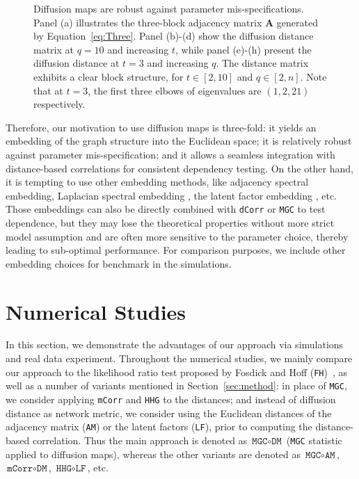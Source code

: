 \documentclass[12pt]{article}
\theoremstyle{definition}
\begin{document}
\begin{figure}[H]
\begin{subfigure}[b]{0.23\textwidth}
			\caption{}
			\label{fig:q10}
		\end{subfigure}
		\caption{Diffusion maps are robust against parameter mis-specifications. Panel (a) illustrates the three-block adjacency matrix $\mathbf{A}$ generated by Equation~\ref{eq:Three}. Panel (b)-(d) show the diffusion distance matrix at $q=10$ and increasing $t$, while panel (e)-(h) present the diffusion distance at $t=3$ and increasing $q$. The distance matrix exhibits a clear block structure, for $t \in [2,10]$ and $q \in [2,n]$. Note that at $t=3$, the first three elbows of eigenvalues are $(1,2,21)$ respectively.}
		\label{fig:diffusions}
	\end{figure}
	
	Therefore, our motivation to use diffusion maps is three-fold: it yields an embedding of the graph structure into the Euclidean space; it is relatively robust against parameter mis-specification; and it allows a seamless integration with distance-based correlations for consistent dependency testing. On the other hand, it is tempting to use other embedding methods, like adjacency spectral embedding, Laplacian spectral embedding \citep{rohe2011spectral}, the latent factor embedding \citep{fosdick2015testing}, etc. Those embeddings can also be directly combined with \texttt{dCorr} or \texttt{MGC} to test dependence, but they may lose the theoretical properties without more strict model assumption and are often more sensitive to the parameter choice, thereby leading to sub-optimal performance. For comparison purposes, we include other embedding choices for benchmark in the simulations.
	
	
	\section{Numerical Studies}
	\label{sec:simulation}
	
	In this section, we demonstrate the advantages of our approach via simulations and real data experiment. Throughout the numerical studies, we mainly compare our approach to the likelihood ratio test proposed by Fosdick and Hoff (\texttt{FH})~\citep{fosdick2015testing}, as well as a number of variants mentioned in Section~\ref{sec:method}: in place of \texttt{MGC}, we consider applying \texttt{mCorr} and \texttt{HHG} to the distances; and instead of diffusion distance as network metric, we consider using the Euclidean distances of the adjacency matrix (\texttt{AM}) or the latent factors (\texttt{LF}), prior to computing the distance-based correlation. Thus the main approach is denoted as $\texttt{MGC} \circ \texttt{DM}$ (\texttt{MGC} statistic applied to diffusion maps), whereas the other variants are denoted as $\texttt{MGC} \circ \texttt{AM}$, $\texttt{mCorr} \circ \texttt{DM}$, $\texttt{HHG} \circ \texttt{LF}$, etc. 
	
\end{document}
